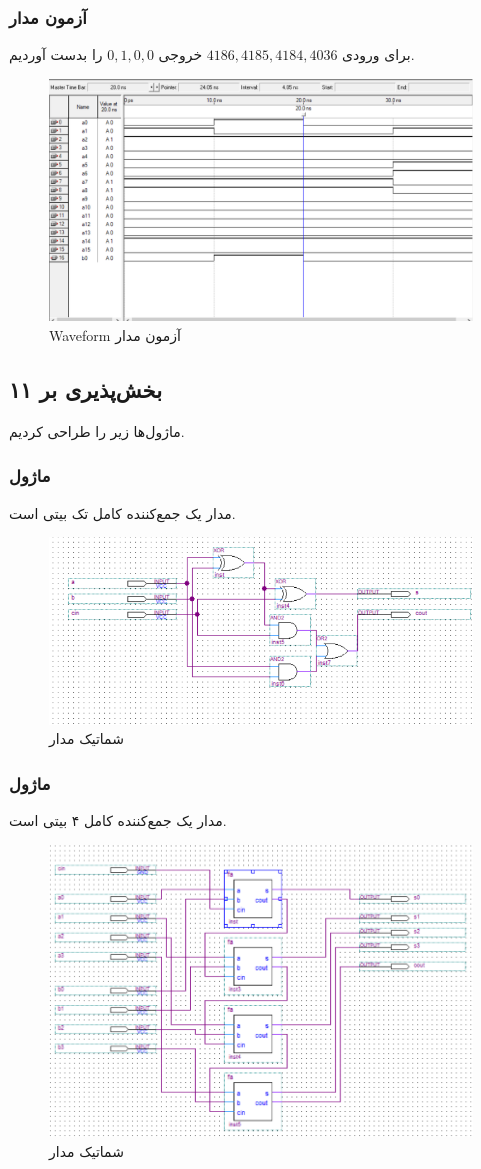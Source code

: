 \documentclass{perassignments}
\begin{document}
	\subsubsection{آزمون مدار}
	برای ورودی 
	\(4186,4185,4184,4036\)
	خروجی 
	\(0,1,0,0\)
	را بدست آوردیم.
	\begin{figure}[H]
		\centering
		\includegraphics[width = 0.8 \textwidth]{graphics/waveform.png}
		\caption{Waveform آزمون مدار}
	\end{figure}
	\subsection{بخش‌پذیری بر ۱۱}
	ماژول‌ها زیر را طراحی کردیم.
	\subsubsection{ماژول }
	مدار یک جمع‌کننده کامل تک بیتی است.
		\begin{figure}[H]
		\centering
		\includegraphics[width = 0.8 \textwidth]{graphics/fa.png}
		\caption{شماتیک مدار }
	\end{figure}
	\subsubsection{ماژول }
	مدار یک جمع‌کننده کامل ۴ بیتی است.
			\begin{figure}[H]
		\centering
		\includegraphics[width = 0.8 \textwidth]{graphics/sum4.png}
		\caption{شماتیک مدار }
	\end{figure}
\end{document}

